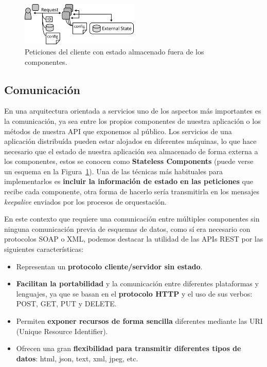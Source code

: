 \begin{figure}
\centering
\includegraphics[width=0.5\textwidth]{stateless.png}
\caption{\label{fig:scomm}Peticiones del cliente con estado almacenado fuera de los componentes\cite{sless}.}
\end{figure}

\subsection{Comunicación}\label{sec:intro}
En una arquitectura orientada a servicios uno de los aspectos más importantes es la comunicación, ya sea entre los propios componentes de nuestra aplicación o los métodos de nuestra API que exponemos al público. Los servicios de una aplicación distribuída pueden estar alojados en diferentes máquinas, lo que hace necesario que el estado de nuestra aplicación sea almacenado de forma externa a los componentes, estos se conocen como \textbf{Stateless Components}  (puede verse un esquema en la Figura~\ref{fig:scomm}). Una de las técnicas más habituales para implementarlos es \textbf{incluir la información de estado en las peticiones} que recibe cada componente, otra forma de hacerlo sería transmitirla en los mensajes \emph{keepalive} enviados por los procesos de orquestación.

En este contexto que requiere una comunicación entre múltiples componentes sin ninguna comunicación previa de esquemas de datos, como sí era necesario con protocolos SOAP o XML, podemos destacar la utilidad de las APIs REST por las siguientes características:

\begin{itemize}
\item Representan un \textbf{protocolo cliente/servidor sin estado}.
\item \textbf{ Facilitan la portabilidad} y la comunicación entre diferentes plataformas y lenguajes, ya que se basan en el \textbf{protocolo HTTP} y el uso de sus verbos: POST, GET, PUT y DELETE.
\item Permiten \textbf{exponer recursos de forma sencilla} diferentes  mediante las URI (Unique Resource Identifier).
\item Ofrecen una gran \textbf{flexibilidad para transmitir diferentes tipos de datos}: html, json, text, xml, jpeg, etc.
\end{itemize}

